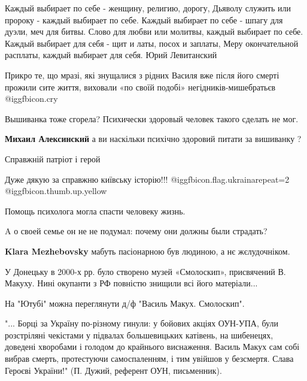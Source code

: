 \begin{itemize}
\begin{itemize}
\end{itemize} %

\obeycr
Каждый выбирает по себе - женщину, религию, дорогу,
Дьяволу служить или пророку - каждый выбирает по себе.
Каждый выбирает по себе - шпагу для дуэли, меч для битвы.
Слово для любви или молитвы, каждый выбирает по себе.
Каждый выбирает для себя - щит и латы, посох и заплаты,
Меру окончательной расплаты, каждый выбирает для себя.
Юрий Левитанский
\restorecr


Прикро те, що мразі, які знущалися з рідних Василя вже після його смерті
прожили сите життя, виховали «по своїй подобі» негідників-мишебратьєв @igg{fbicon.cry} 

Вышиванка тоже сгорела? Психически здоровый человек такого сделать не мог.

\begin{itemize} %
\textbf{Михаил Алексинский} а ви наскільки психічно здоровий питати за вишиванку ?
\end{itemize} %

Справжній патріот і герой

Дуже дякую за справжню київську історію!!!  @igg{fbicon.flag.ukraina}{repeat=2}   @igg{fbicon.thumb.up.yellow} 

Помощь психолога могла спасти человеку жизнь.

A о своей семье он не не подумал: почему они должны были страдать?

\begin{itemize} %
\textbf{Klara Mezhebovsky} мабуть пасіонарною був людиною, а нє жєлудочніком.
\end{itemize} %


У Донецьку в 2000-х рр. було створено музей «Смолоскип», присвячений В. Макуху.
Нині окупанти з РФ повністю знищили всі його матеріали...

На "Ютубі" можна переглянути д/ф "Василь Макух. Смолоскип".

"... Борці за Україну по-різному гинули: у бойових акціях ОУН-УПА, були
розстріляні чекістами у підвалах большевицьких катівень, на шибенецях, доведені
хворобами і голодом до крайнього виснаження. Василь Макух сам собі вибрав
смерть, протестуючи самоспаленням, і тим увійшов у безсмертя. Слава Героєві
України!" (П. Дужий, референт ОУН, письменник).


\end{itemize}
